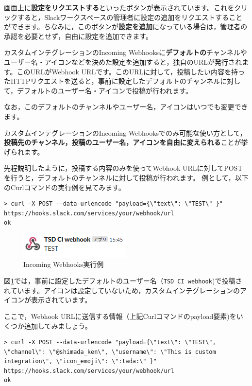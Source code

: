\documentclass[uplatex,a4j]{jsarticle}
\begin{document}
画面上に\textbf{設定をリクエストする}といったボタンが表示されています。これをクリックすると，Slackワークスペースの管理者に設定の追加をリクエストすることができます。ちなみに，このボタンが\textbf{設定を追加}になっている場合は，管理者の承認を必要とせず，自由に設定を追加できます。


カスタムインテグレーションのIncoming Webhooksに\textbf{デフォルトの}チャンネルやユーザー名・アイコンなどを決めた設定を追加すると，独自のURLが発行されます。このURLがWebhook URLです。このURLに対して，投稿したい内容を持ったHTTPリクエストを送ると，事前に設定したデフォルトのチャンネルに対して，デフォルトのユーザー名・アイコンで投稿が行われます。


なお，このデフォルトのチャンネルやユーザー名，アイコンはいつでも変更できます。

\clearpage
カスタムインテグレーションのIncoming Webhooksでのみ可能な使い方として，\textbf{投稿先のチャンネル，投稿のユーザー名，アイコンを自由に変えられる}ことが挙げられます。

先程説明したように，投稿する内容のみを使ってWebhook URLに対してPOSTを行うと，デフォルトのチャンネルに対して投稿が行われます。
例として，以下のCurlコマンドの実行例を見てみます。

\begin{lstlisting}[basicstyle=\ttfamily\footnotesize,language=command.com,frame=single,caption=Curl sample]
> curl -X POST --data-urlencode "payload={\"text\": \"TEST\" }" https://hooks.slack.com/services/your/webhook/url
ok
\end{lstlisting}

\begin{figure}[h]
 \centering
 \includegraphics[keepaspectratio, scale=0.8]{images/webhook_sample2.png}
 \caption{Incoming Webhooks実行例}
 \label{fig:webhook_sample2}
\end{figure}

図\ref{fig:webhook_sample2}では，事前に設定したデフォルトのユーザー名（\verb|TSD CI webhook|)で投稿されています。アイコンは設定していないため，カスタムインテグレーションのアイコンが表示されています。

ここで，Webhook URLに送信する情報（上記Curlコマンドのpayload要素)をいくつか追加してみましょう。

\begin{lstlisting}[basicstyle=\ttfamily\footnotesize,language=command.com,frame=single,caption=Curl sample2]
> curl -X POST --data-urlencode "payload={\"text\": \"TEST\", \"channel\": \"@shimada_ken\", \"username\": \"This is custom integration\", \"icon_emoji\": \":tada:\" }" https://hooks.slack.com/services/your/webhook/url
ok
\end{lstlisting}
\end{document}

